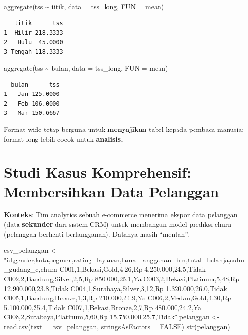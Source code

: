 \documentclass[
  indonesian,
  letterpaper,
]{book}
\newenvironment{Shaded}{\begin{snugshade}}{\end{snugshade}}
\newcommand{\AttributeTok}[1]{\textcolor[rgb]{0.40,0.45,0.13}{#1}}
\newcommand{\ConstantTok}[1]{\textcolor[rgb]{0.56,0.35,0.01}{#1}}
\newcommand{\FunctionTok}[1]{\textcolor[rgb]{0.28,0.35,0.67}{#1}}
\newcommand{\NormalTok}[1]{\textcolor[rgb]{0.00,0.23,0.31}{#1}}
\newcommand{\OtherTok}[1]{\textcolor[rgb]{0.00,0.23,0.31}{#1}}
\newcommand{\SpecialCharTok}[1]{\textcolor[rgb]{0.37,0.37,0.37}{#1}}
\newcommand{\StringTok}[1]{\textcolor[rgb]{0.13,0.47,0.30}{#1}}
\begin{document}
\begin{Shaded}
\begin{Highlighting}[]
\FunctionTok{aggregate}\NormalTok{(tss }\SpecialCharTok{\textasciitilde{}}\NormalTok{ titik, }\AttributeTok{data =}\NormalTok{ tss\_long, }\AttributeTok{FUN =}\NormalTok{ mean)}
\end{Highlighting}
\end{Shaded}

\begin{verbatim}
   titik      tss
1  Hilir 218.3333
2   Hulu  45.0000
3 Tengah 118.3333
\end{verbatim}

\begin{Shaded}
\begin{Highlighting}[]
\FunctionTok{aggregate}\NormalTok{(tss }\SpecialCharTok{\textasciitilde{}}\NormalTok{ bulan, }\AttributeTok{data =}\NormalTok{ tss\_long, }\AttributeTok{FUN =}\NormalTok{ mean)}
\end{Highlighting}
\end{Shaded}

\begin{verbatim}
  bulan      tss
1   Jan 125.0000
2   Feb 106.0000
3   Mar 150.6667
\end{verbatim}

Format wide tetap berguna untuk \textbf{menyajikan} tabel kepada pembaca
manusia; format long lebih cocok untuk \textbf{analisis.}

\section{Studi Kasus Komprehensif: Membersihkan Data
Pelanggan}\label{studi-kasus-komprehensif-membersihkan-data-pelanggan}

\textbf{Konteks}: Tim analytics sebuah e-commerce menerima ekspor data
pelanggan (data \textbf{sekunder} dari sistem CRM) untuk membangun model
prediksi churn (pelanggan berhenti berlangganan). Datanya masih
``mentah''.

\begin{Shaded}
\begin{Highlighting}[]
\NormalTok{csv\_pelanggan }\OtherTok{\textless{}{-}} \StringTok{"id,gender,kota,segmen,rating\_layanan,lama\_langganan\_bln,total\_belanja,suhu\_gudang\_c,churn}
\StringTok{C001,1,Bekasi,Gold,4,26,Rp 4.250.000,24.5,Tidak}
\StringTok{C002,2,Bandung,Silver,2,5,Rp 850.000,25.1,Ya}
\StringTok{C003,2,Bekasi,Platinum,5,48,Rp 12.900.000,23.8,Tidak}
\StringTok{C004,1,Surabaya,Silver,3,12,Rp 1.320.000,26.0,Tidak}
\StringTok{C005,1,Bandung,Bronze,1,3,Rp 210.000,24.9,Ya}
\StringTok{C006,2,Medan,Gold,4,30,Rp 5.100.000,25.4,Tidak}
\StringTok{C007,1,Bekasi,Bronze,2,7,Rp 480.000,24.2,Ya}
\StringTok{C008,2,Surabaya,Platinum,5,60,Rp 15.750.000,25.7,Tidak"}
\NormalTok{pelanggan }\OtherTok{\textless{}{-}} \FunctionTok{read.csv}\NormalTok{(}\AttributeTok{text =}\NormalTok{ csv\_pelanggan, }\AttributeTok{stringsAsFactors =} \ConstantTok{FALSE}\NormalTok{)}
\FunctionTok{str}\NormalTok{(pelanggan)}
\end{Highlighting}
\end{Shaded}
\end{document}
